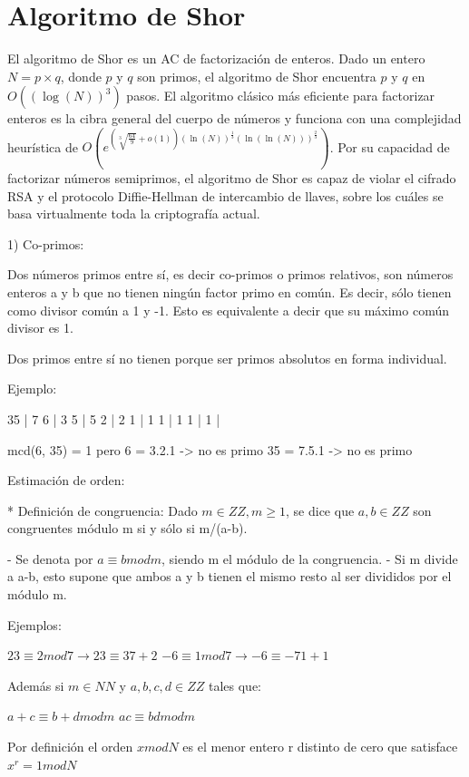 \documentclass[11pt, spanish]{report}
\begin{document}
\chapter{Algoritmo de Shor}
El algoritmo de Shor es un AC de factorización de enteros. Dado un entero $N=p \times q$, donde $p$ y $q$ son primos, el algoritmo de Shor encuentra $p$ y $q$ en $O((\log(N))^3)$ pasos. El algoritmo clásico más eficiente para factorizar enteros es la cibra general del cuerpo de números y funciona con una complejidad heurística de $O(e^{(\sqrt[3]{\frac{64}{9}}+o(1))(\ln(N))^{\frac{1}{3}}(\ln(\ln(N)))^{\frac{2}{3}}})$. Por su capacidad de factorizar números semiprimos, el algoritmo de Shor es capaz de violar el cifrado RSA y el protocolo Diffie-Hellman de intercambio de llaves, sobre los cuáles se basa virtualmente toda la criptografía actual.

1) Co-primos:

Dos números primos entre sí, es decir co-primos o primos relativos, son números enteros a y b que no tienen ningún factor primo en común. Es decir, sólo tienen como divisor común a 1 y -1. Esto es equivalente a decir que su máximo común divisor es 1.

Dos primos entre sí no tienen porque ser primos absolutos en forma individual.

Ejemplo:

35 | 7          6 | 3
 5 | 5          2 | 2
 1 | 1          1 | 1
 1 |            1 |

 mcd(6, 35) = 1
 pero 6 = 3.2.1 -> no es primo
 35 = 7.5.1 -> no es primo

 Estimación de orden:

 * Definición de congruencia: Dado $m \in ZZ, m \geq 1$, se dice que $a,b \in ZZ$ son congruentes módulo m si y sólo si m/(a-b).

 - Se denota por $a \equiv b mod m$, siendo m el módulo de la congruencia.
 - Si m divide a a-b, esto supone que ambos a y b tienen el mismo resto al ser divididos por el módulo m.

 Ejemplos:

 $23 \equiv 2 mod 7 \rightarrow 23 \equiv 3 7 + 2$
 $-6 \equiv 1 mod 7 \rightarrow -6 \equiv -7 1 +1$

 Además si $m \in NN$ y $a,b,c,d \in ZZ$ tales que:

 $a+c \equiv b+d mod m$
 $a c \equiv b d mod m$

 Por definición el orden $x mod N$ es el menor entero r distinto de cero que satisface $x^r = 1 mod N$
 
\end{document}

